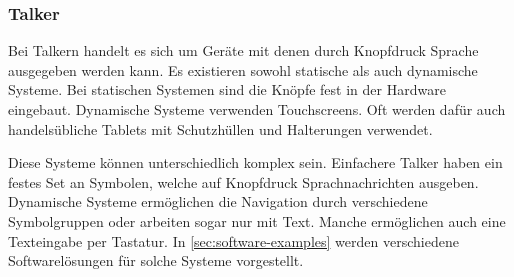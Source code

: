 		\subsubsection*{Talker}
        	Bei Talkern handelt es sich um Geräte mit denen durch Knopfdruck Sprache ausgegeben werden kann. Es existieren sowohl statische als auch dynamische Systeme. Bei statischen Systemen sind die Knöpfe fest in der Hardware eingebaut. Dynamische Systeme verwenden Touchscreens. Oft werden dafür auch handelsübliche Tablets mit Schutzhüllen und Halterungen verwendet. 
            
            Diese Systeme können unterschiedlich komplex sein. Einfachere Talker haben ein festes Set an Symbolen, welche auf Knopfdruck Sprachnachrichten ausgeben. Dynamische Systeme ermöglichen die Navigation durch verschiedene Symbolgruppen oder arbeiten sogar nur mit Text. Manche ermöglichen auch eine Texteingabe per Tastatur. In \autoref{sec:software-examples} werden verschiedene Softwarelösungen für solche Systeme vorgestellt.
            
